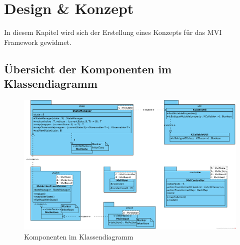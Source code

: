 \section{Design \& Konzept}
\label{sec:design-und-konzept}
In diesem Kapitel wird sich der Erstellung eines Konzepts für das MVI Framework gewidmet. 

\subsection{Übersicht der Komponenten im Klassendiagramm}
\begin{figure}
		\includegraphics[width=\textwidth]{./images/framework-class-diagram}
		\caption{Komponenten im Klassendiagramm}
\end{figure}
\clearpage

